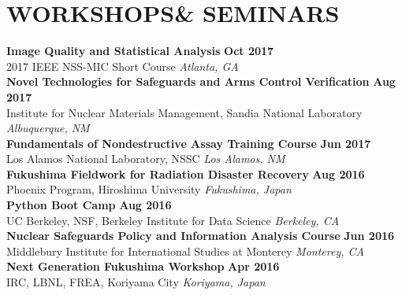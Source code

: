 \section{\small{WORKSHOPS\newline \& SEMINARS}}


{\bf Image Quality and Statistical Analysis} \hfill {\bf Oct 2017}\\
{\small{2017 IEEE NSS-MIC Short Course}} \hfill {\sl Atlanta, GA}\\[-3.5ex]

{\bf Novel Technologies for Safeguards and Arms Control Verification} \hfill {\bf Aug 2017}\\
{\small{Institute for Nuclear Materials Management, Sandia National Laboratory}} \hfill {\sl Albuquerque, NM}\\[-3.5ex]

{\bf Fundamentals of Nondestructive Assay Training Course} \hfill {\bf Jun 2017}\\
{\small{Los Alamos National Laboratory, NSSC}} \hfill {\sl Los Alamos, NM}\\[-3.5ex]

\newpage
{\bf Fukushima Fieldwork for Radiation Disaster Recovery} \hfill {\bf Aug 2016}\\
{\small{Phoenix Program, Hiroshima University}} \hfill {\sl Fukushima, Japan}\\[-3.5ex]

{\bf Python Boot Camp} \hfill {\bf Aug 2016}\\
{\small{UC Berkeley, NSF, Berkeley Institute for Data Science}} \hfill {\sl Berkeley, CA}\\[-3.5ex]

{\bf Nuclear Safeguards Policy and Information Analysis Course} \hfill {\bf Jun 2016}\\
{\small{Middlebury Institute for International Studies at Monterey}} \hfill {\sl Monterey, CA}\\[-3.5ex]

{\bf Next Generation Fukushima Workshop} \hfill {\bf Apr 2016}\\
{\small{IRC, LBNL, FREA, Koriyama City}} \hfill {\sl Koriyama, Japan}\\[-3.5ex]

